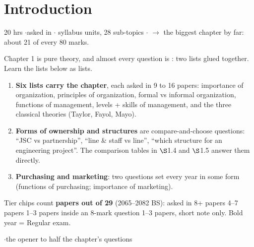 \section{Introduction}
{\color{sub}\footnotesize 20 hrs \gap$\cdot$\gap asked in 
\gap$\cdot$ syllabus units, 28 sub-topics \gap$\cdot$\gap {}
$\rightarrow$ the biggest chapter by far: about 21 of every 80 marks.}

\vspace{3pt}\noindent
\colorbox{gdL}{\makebox[\dimexpr\textwidth-2\fboxsep][l]{%
  \textcolor{gd}{\bfseries\footnotesize READ THIS FIRST}}}
\par\nobreak\vspace{3pt}

Chapter 1 is pure theory, and almost every question is : two lists glued together. Learn the lists below as lists.
\begin{enumerate}[label=\arabic*., leftmargin=1.4em, itemsep=1pt]
  \item \textbf{Six lists carry the chapter}, each asked in 9 to 16 papers: importance of
    organization, principles of organization, formal vs informal organization, functions of
    management, levels + skills of management, and the three classical theories (Taylor,
    Fayol, Mayo).
  \item \textbf{Forms of ownership and structures} are compare-and-choose questions:
    ``JSC vs partnership'', ``line \& staff vs line'', ``which structure for an engineering
    project''. The comparison tables in $\S$1.4 and $\S$1.5 answer them directly.
  \item \textbf{Purchasing and marketing}: two questions set every year in some form
    (functions of purchasing; importance of marketing).
\end{enumerate}
Tier chips count \textbf{papers out of 29} (2065--2082 BS):
 asked in 8+ papers \gap {} 4--7 papers \gap {} 1--3 papers inside an
8-mark question \gap {} 1--3 papers, short note only. Bold year = Regular exam.

\hr


{\color{sub}\footnotesize {}  \gap$\cdot$\gap the opener to half the chapter's questions}

